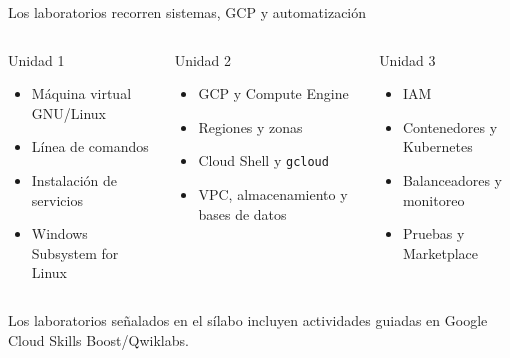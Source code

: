 \documentclass[aspectratio=169,10pt,c]{beamer}
\begin{document}
\begin{frame}{Los laboratorios recorren sistemas, GCP y automatización}
\begin{columns}[T,onlytextwidth]
\begin{block}{Unidad 1}
\footnotesize
\begin{itemize}\setlength\itemsep{2pt}
  \item Máquina virtual GNU/Linux
  \item Línea de comandos
  \item Instalación de servicios
  \item Windows Subsystem for Linux
\end{itemize}
\end{block}
\begin{exampleblock}{Unidad 2}
\footnotesize
\begin{itemize}\setlength\itemsep{2pt}
  \item GCP y Compute Engine
  \item Regiones y zonas
  \item Cloud Shell y \texttt{gcloud}
  \item VPC, almacenamiento y bases de datos
\end{itemize}
\end{exampleblock}
\begin{alertblock}{Unidad 3}
\footnotesize
\begin{itemize}\setlength\itemsep{2pt}
  \item IAM
  \item Contenedores y Kubernetes
  \item Balanceadores y monitoreo
  \item Pruebas y Marketplace
\end{itemize}
\end{alertblock}
\end{columns}
\vspace{0.2cm}
\small Los laboratorios señalados en el sílabo incluyen actividades guiadas en Google Cloud Skills Boost/Qwiklabs.
\end{frame}
\end{document}
